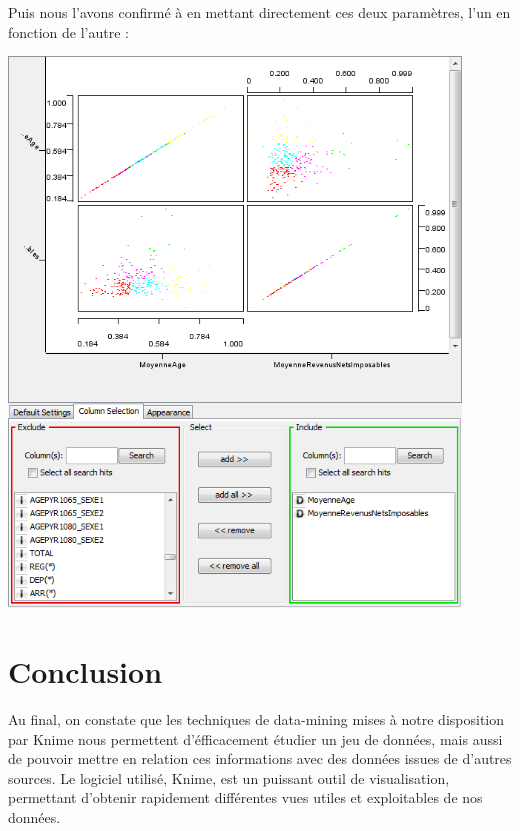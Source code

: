 Puis nous l'avons confirmé à en mettant directement ces deux paramètres, l'un en fonction de l'autre :

\begin{center}
	\includegraphics[width=0.9\textwidth]{png/scatter-matrix-age-revenu.png}
\end{center}


\section{Conclusion}

Au final, on constate que les techniques de data-mining mises à notre disposition par Knime nous permettent d'éfficacement étudier un jeu de données, mais aussi de pouvoir mettre en relation ces informations avec des données issues de d'autres sources. Le logiciel utilisé, Knime, est un puissant outil de visualisation, permettant d'obtenir rapidement différentes vues utiles et exploitables de nos données.